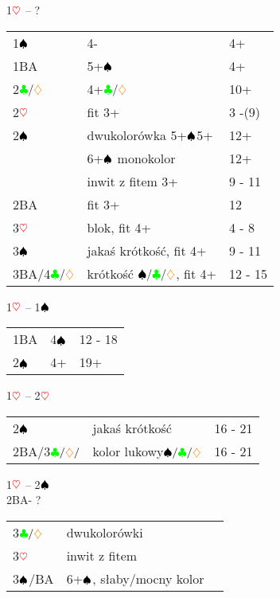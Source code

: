 \documentclass[a4paper,11pt]{article}
\newcommand{\CC}{\textcolor{green}\clubsuit}
\newcommand{\DD}{\textcolor{orange}\diamondsuit}
\newcommand{\HH}{\textcolor{red}\heartsuit}
\newcommand{\PP}{\textcolor{black}\spadesuit}
\begin{document}
\begin{center}\LARGE{1$\HH$ -- ?}\\
\end{center}
\begin{tabular}{p{2cm} p{10cm} l}
	1$\PP$ & 4- & 4+\\
	1BA & 5+$\PP$ & 4+\\
	2$\CC/\DD$ & 4+$\CC/\DD$ & 10+\\
	2$\HH$ &  fit 3+ & 3 -(9)\\
	2$\PP$ & dwukolorówka 5+$\PP$5+ & 12+\\
	& 6+$\PP$ monokolor & 12+\\
	& inwit z fitem 3+& 9 - 11\\
	2BA\footnotemark[1] & fit 3+ & 12\\
	3$\HH$ & blok, fit 4+ & 4 - 8\\
	3$\PP$ & jakaś krótkość, fit 4+ & 9 - 11\\
	3BA/4$\CC/\DD$ & krótkość $\PP/\CC/\DD$, fit 4+ & 12 - 15 \\
\end{tabular}

\begin{center}\LARGE{1$\HH$ -- 1$\PP$ }\\
\end{center}
\begin{tabular}{p{2cm} p{10cm} l}
	1BA & 4$\PP$ & 12 - 18\\
	2$\PP$ & 4+ & 19+\\
\end{tabular}


\begin{center}\LARGE{1$\HH$ -- 2$\HH$ }\\
\end{center}
\begin{tabular}{p{2cm} p{10cm} l}
	2$\PP$ & jakaś krótkość & 16 - 21\\
	2BA/3$\CC/\DD/$ & kolor lukowy\footnotemark[2] $\PP/\CC/\DD$ & 16 - 21\\
\end{tabular}

\begin{center}\LARGE{1$\HH$ -- 2$\PP$\\2BA\footnotemark[3] - ? }\\
\end{center}
\begin{tabular}{p{2cm} p{10cm} l}
	3$\CC/\DD$ & dwukolorówki\\
	3$\HH$ & inwit z fitem\\
	3$\PP$/BA & 6+$\PP$, słaby/mocny kolor\\
\end{tabular}
\end{document}

